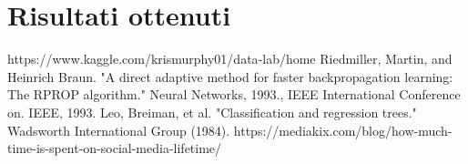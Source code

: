 \documentclass[11pt]{article}
\begin{document}
\section{Risultati ottenuti}

\begin{thebibliography}{12}
     https://www.kaggle.com/krismurphy01/data-lab/home
     Riedmiller, Martin, and Heinrich Braun. "A direct adaptive method for faster backpropagation learning: The RPROP algorithm." Neural Networks, 1993., IEEE International Conference on. IEEE, 1993.
     Leo, Breiman, et al. "Classification and regression trees." Wadsworth International Group (1984).
     https://mediakix.com/blog/how-much-time-is-spent-on-social-media-lifetime/
\end{thebibliography}
\end{document}
